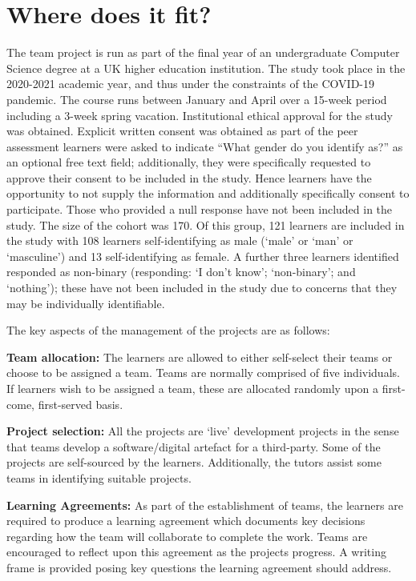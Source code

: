 \documentclass[sigconf, anonymous=false]{acmart}
\begin{document}
\section{Where does it fit?}
The team project is run as part of the final year of an undergraduate
Computer Science degree at a UK higher education institution. The
study took place in the 2020-2021 academic year, and thus under the
constraints of the COVID-19 pandemic. The course runs between January
and April over a 15-week period including a 3-week spring
vacation. Institutional ethical approval for the study was
obtained. Explicit written consent was obtained as part of the peer
assessment learners were asked to indicate ``What gender do you
identify as?'' as an optional free text field; additionally, they were
specifically requested to approve their consent to be included in the
study. Hence learners have the opportunity to not supply the
information and additionally specifically consent to
participate. Those who provided a null response have not been included
in the study. The size of the cohort was 170. Of this group, 121
learners are included in the study with 108 learners self-identifying
as male (`male' or `man' or `masculine') and 13 self-identifying as
female. A further three learners identified responded as non-binary
(responding: `I don't know'; `non-binary'; and `nothing'); these have
not been included in the study due to concerns that they may be
individually identifiable.

The key aspects of the management of the projects are as
follows:

    \textbf{Team allocation:}
The learners are allowed to either self-select their teams or choose
to be assigned a team. Teams are normally comprised of five
individuals. If learners wish to be assigned a team, these are
allocated randomly upon a first-come, first-served basis.

\textbf {Project selection:}
All the projects are `live' development projects in the sense that
teams develop a software/digital artefact for a third-party. Some of the
projects are self-sourced by the learners. Additionally, the tutors
assist some teams in identifying suitable projects.

\textbf{Learning Agreements:}
As part of the establishment of teams, the learners are required to
produce a learning agreement which documents key decisions regarding
how the team will collaborate to complete the work. Teams are
encouraged to reflect upon this agreement as the projects progress. A
writing frame is provided posing key questions the learning agreement
should address.
\end{document}

